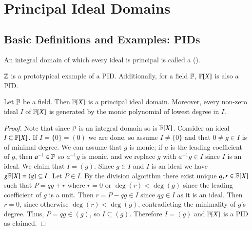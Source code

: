\chapter{ Principal Ideal Domains}
\label{PIDs}
\section{ Basic Definitions and Examples: PIDs}

\begin{definition}
    An integral domain of which every ideal is principal is called a  ().
\end{definition}

\begin{remark}
    $\mathbb Z$ is a prototypical example of a PID. Additionally, for a field $\mathbb F$, $\mathbb F[X]$ is also a PID.
\end{remark}

\begin{theorem}
    Let $\mathbb F$ be a field. Then $\mathbb F[X]$ is a principal ideal domain. Moreover, every non-zero ideal $I$ of $\mathbb F[X]$ is generated by the monic polynomial of lowest degree in $I$.
\end{theorem}
\begin{proof}
    Note that since $\mathbb F$ is an integral domain so is $\mathbb F[X]$. Consider an ideal $I \subseteq \mathbb F[X]$. If $I = \{0\} = (0)$ we are done, so assume $I \neq \{0\}$ and that $0 \neq g \in I$ is of minimal degree. We can assume that $g$ is monic; if $a$ is the leading coefficient of $g$, then $a^{-1} \in \mathbb F$ so $a^{-1}g$ is monic, and we replace $g$ with $a^{-1}g \in I$ since $I$ is an ideal. We claim that $I = (g)$. Since $g \in I$ and $I$ is an ideal we have $g\mathbb F[X] = (g) \subseteq I$. Let $P \in I$. By the division algorithm there exist unique $q,r \in \mathbb F[X]$ such that $P = qg + r$ where $r = 0$ or $\deg(r) < \deg(g)$ since the leading coefficient of $g$ is a unit. Then $r = P - qg \in I$ since $qg \in I$ as it is an ideal. Then $r = 0$, since otherwise $\deg(r) < \deg(g)$, contradicting the minimality of $g$'s degree. Thus, $P = qg \in (g)$, so $I \subseteq (g)$. Therefore $I = (g)$ and $\mathbb F[X]$ is a PID as claimed.
\end{proof}
